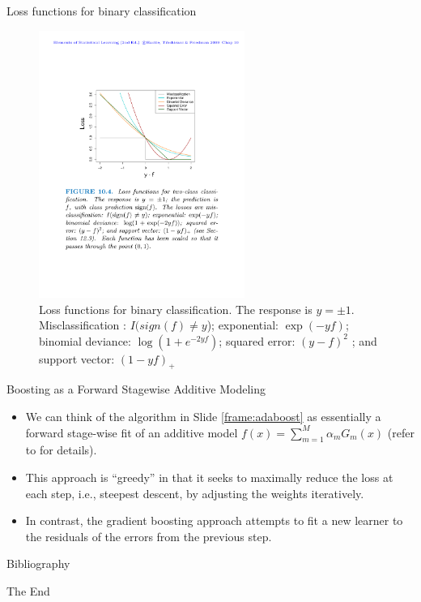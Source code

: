\documentclass{beamer}
\begin{document}
\begin{frame}{Loss functions for binary classification}
\begin{figure}
    \centering
    \includegraphics[width=0.6\textwidth]{figures/lossfunctions.pdf}
    \caption{Loss functions for binary classification. The response is $y = \pm1$. Misclassification : $I(sign(f) \neq y$); exponential: $\exp(-yf)$; binomial deviance: $\log(1 + e^{-2yf})$; squared error: $(y - f)^2$ ; and support vector: $(1 - yf)_+$}
\end{figure}
\end{frame}


\begin{frame}{Boosting as a Forward Stagewise Additive Modeling}
    \begin{itemize}
        \item We can think of the algorithm in Slide \ref{frame:adaboost} as essentially a forward stage-wise fit of an additive model $f(x) = \sum_{m=1}^M \alpha_m G_m(x)$ (refer to \cite{hastieElementsStatisticalLearning2016} for details).
        \item This approach is ``greedy'' in that it seeks to maximally reduce the loss at each step, i.e., steepest descent, by adjusting the weights iteratively.
        \item In contrast, the gradient boosting approach attempts to fit a new learner to the residuals of the errors from the previous step. 
    \end{itemize}
\end{frame}


\begin{frame}{Bibliography}
    
    
\end{frame}




\begin{frame}
    \Huge{\centerline{The End}}
\end{frame}
\end{document}
